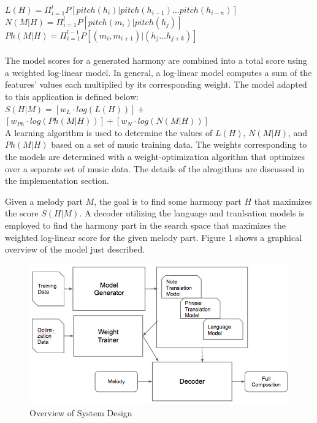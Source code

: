 \documentclass{sig-alternate}
\begin{document}
$L(H) = \Pi_{i = 1}^{l} P[pitch(h_{i}) | pitch(h_{i - 1}) \ldots pitch(h_{i - n})]$\\

$N(M | H) = \Pi_{i = 1}^{l} P[pitch(m_{i}) | pitch(h_{j})]$\\

$Ph(M | H) = \Pi_{i = 1}^{l - 1} P[(m_{i}, m_{i + 1}) | (h_{j} \ldots h_{j + k})]$\\
\\

The model scores for a generated harmony are combined into a total score using a weighted log-linear model. In general, a log-linear model computes a sum of the features' values each multiplied by its corresponding weight. The model adapted to this application is defined below:\\

$S(H | M) = [w_{L}\cdot log(L(H))] + $\\

$[w_{Ph}\cdot log(Ph(M | H))] + [w_{N}\cdot log(N(M | H))]$\\

A learning algorithm is used to determine the values of $L(H)$, $N(M | H)$, and $Ph(M | H)$ based on a set of music training data. The weights corresponding to the models are determined with a weight-optimization algorithm that optimizes over a separate set of music data. The details of the alrogithms are discussed in the implementation section.

Given a melody part $M$, the goal is to find some harmony part $H$ that maximizes the score $S(H | M)$.
A decoder utilizing  the language and tranlsation models is employed to find the harmony part in the search space that maximizes the weighted log-linear score for the given melody part. Figure 1 shows a graphical overview of the model just described.
\begin{figure}
\includegraphics[scale=0.3]{system_design.png}
\caption{Overview of System Design}
\end{figure}
\end{document}
